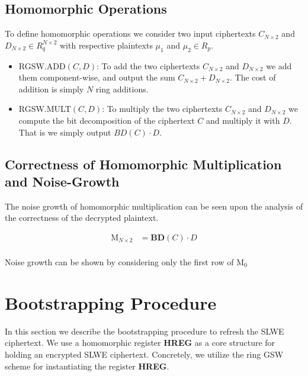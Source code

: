 \documentclass[10pt,journal,compsoc]{IEEEtran}
\theoremstyle{definition}
\begin{document}
\subsection{Homomorphic Operations}

To define homomorphic operations we consider two input ciphertexts $C_{N\times 2}$ and $D_{N\times 2} \in R_q^{N\times 2}$ with respective plaintexts $\mu_1$ and $\mu_2 \in R_p$.

\begin{itemize}
\item RGSW.ADD$\left(C,D\right)$: To add the two ciphertexts $C_{N\times 2}$ and $D_{N\times 2}$ we add them component-wise, and output the sum $C_{N\times 2} + D_{N\times 2}$. The cost of addition is simply $N$ ring additions.
\item RGSW.MULT$\left(C,D\right)$: To multiply the two ciphertexts $C_{N\times 2}$ and $D_{N\times 2}$ we compute the bit decomposition of the ciphertext $C$ and multiply it with $D$. That is we simply output $BD\left(C\right)\cdot D.$
\end{itemize}

\subsection{Correctness of Homomorphic Multiplication and Noise-Growth}

The noise growth of homomorphic multiplication can be seen upon the analysis of the correctness of the decrypted plaintext.  

\begin{equation*}
\begin{split}
\textrm{M}_{N\times 2} & = \textbf{BD}\left(C\right)\cdot D\\
\end{split}
\end{equation*}

Noise growth can be shown by considering only the first row of M$_0$


\section{Bootstrapping Procedure}

In this section we describe the bootstrapping procedure to refresh the SLWE ciphertext. We use a homomorphic register \textbf{HREG} as a core structure for holding an encrypted SLWE ciphertext. Concretely, we utilize the ring GSW scheme for instantiating the register \textbf{HREG}.
\end{document}
